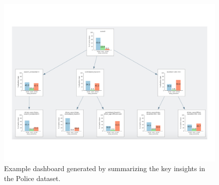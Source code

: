 \begin{figure}[h!]
\label{fig:sbd}
\centering
\includegraphics[width=0.7\linewidth]{figures/storyboard.pdf}
\caption{Example dashboard generated by \sbd summarizing the key insights in the Police dataset.}
\end{figure} 

